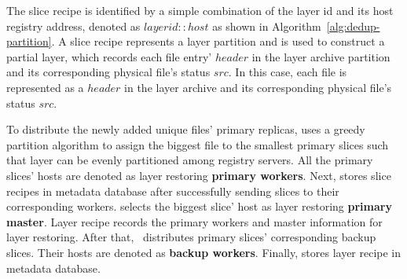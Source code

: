 The slice recipe is identified by a simple combination of the layer id and its host registry address,
denoted as $layerid::host$ as shown in Algorithm~\ref{alg:dedup-partition}.
A slice recipe represents a layer partition and
is used to construct a partial layer,
which
records each file entry' $header$ in the layer archive partition and 
its corresponding physical file's status $src$. 
In this case, 
each file is represented as a $header$ in the layer archive and
its corresponding physical file's status $src$. 




To distribute the newly added unique files' primary replicas,
\sysname uses a greedy partition algorithm to 
assign the biggest file to the smallest primary slices
such that layer can be evenly partitioned among registry servers.
All the primary slices' hosts are denoted as layer restoring \textbf{primary workers}. 
Next, \sysname stores slice recipes in metadata database after successfully
sending slices to their corresponding workers.
\sysname selects the biggest slice' host as layer restoring \textbf{primary master}.
Layer recipe records the primary workers and master information for layer restoring.
After that, \sysname~distributes primary slices' corresponding backup slices.
Their hosts are denoted as \textbf{backup workers}.
Finally, \sysname stores layer recipe in metadata database.



